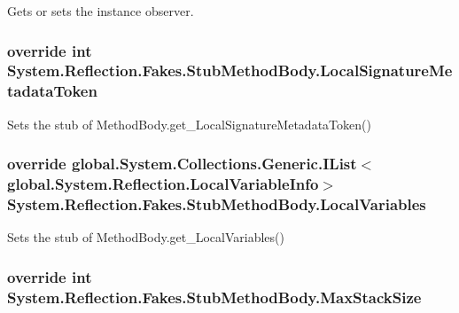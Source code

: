 Gets or sets the instance observer.

\hypertarget{class_system_1_1_reflection_1_1_fakes_1_1_stub_method_body_a3bac28b9ad8d16dce0862c0144159d92}{
\subsubsection[{Local\-Signature\-Metadata\-Token}]{\setlength{\rightskip}{0pt plus 5cm}override int System.\-Reflection.\-Fakes.\-Stub\-Method\-Body.\-Local\-Signature\-Metadata\-Token\hspace{0.3cm}{\ttfamily [get]}}}\label{class_system_1_1_reflection_1_1_fakes_1_1_stub_method_body_a3bac28b9ad8d16dce0862c0144159d92}


Sets the stub of Method\-Body.\-get\-\_\-\-Local\-Signature\-Metadata\-Token()

\hypertarget{class_system_1_1_reflection_1_1_fakes_1_1_stub_method_body_a9319b11d9381ed0329503301f2d1da96}{
\subsubsection[{Local\-Variables}]{\setlength{\rightskip}{0pt plus 5cm}override global.\-System.\-Collections.\-Generic.\-I\-List$<$global.\-System.\-Reflection.\-Local\-Variable\-Info$>$ System.\-Reflection.\-Fakes.\-Stub\-Method\-Body.\-Local\-Variables\hspace{0.3cm}{\ttfamily [get]}}}\label{class_system_1_1_reflection_1_1_fakes_1_1_stub_method_body_a9319b11d9381ed0329503301f2d1da96}


Sets the stub of Method\-Body.\-get\-\_\-\-Local\-Variables()

\hypertarget{class_system_1_1_reflection_1_1_fakes_1_1_stub_method_body_ae3483636a3708860024b5e4ec5c8db38}{
\subsubsection[{Max\-Stack\-Size}]{\setlength{\rightskip}{0pt plus 5cm}override int System.\-Reflection.\-Fakes.\-Stub\-Method\-Body.\-Max\-Stack\-Size\hspace{0.3cm}{\ttfamily [get]}}}\label{class_system_1_1_reflection_1_1_fakes_1_1_stub_method_body_ae3483636a3708860024b5e4ec5c8db38}


